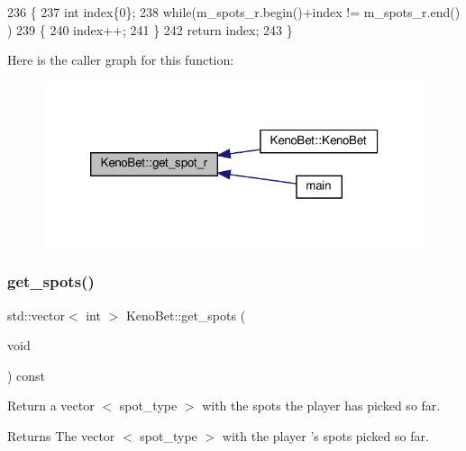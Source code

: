 \begin{DoxyCode}
236 \{
237     \textcolor{keywordtype}{int} index\{0\};
238     \textcolor{keywordflow}{while}(m\_spots\_r.begin()+index != m\_spots\_r.end() )
239     \{
240         index++;
241     \}
242     \textcolor{keywordflow}{return} index;
243 \}
\end{DoxyCode}
Here is the caller graph for this function\+:
\nopagebreak
\begin{figure}[H]
\begin{center}
\leavevmode
\includegraphics[width=320pt]{classKenoBet_a79f26e472d9a60894e25094a37d06eb6_icgraph}
\end{center}
\end{figure}
\mbox{\label{classKenoBet_a382454c66974466900d168c398699483}} 
\subsubsection{\texorpdfstring{get\+\_\+spots()}{get\_spots()}}
{\footnotesize\ttfamily std\+::vector$<$ int $>$ Keno\+Bet\+::get\+\_\+spots (\begin{DoxyParamCaption}\item[{void}]{ }\end{DoxyParamCaption}) const}



Return a vector $<$ spot\+\_\+type $>$ with the spots the player has picked so far. 

\begin{DoxyReturn}{Returns}
The vector $<$ spot\+\_\+type $>$ with the player ’s spots picked so far. 
\end{DoxyReturn}

